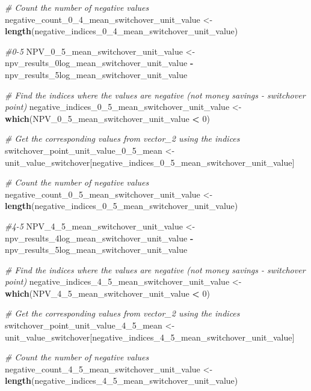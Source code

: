 \documentclass[
]{article}
\newenvironment{Shaded}{\begin{snugshade}}{\end{snugshade}}
\newcommand{\CommentTok}[1]{\textcolor[rgb]{0.56,0.35,0.01}{\textit{#1}}}
\newcommand{\DecValTok}[1]{\textcolor[rgb]{0.00,0.00,0.81}{#1}}
\newcommand{\FunctionTok}[1]{\textcolor[rgb]{0.13,0.29,0.53}{\textbf{#1}}}
\newcommand{\NormalTok}[1]{#1}
\newcommand{\OtherTok}[1]{\textcolor[rgb]{0.56,0.35,0.01}{#1}}
\newcommand{\SpecialCharTok}[1]{\textcolor[rgb]{0.81,0.36,0.00}{\textbf{#1}}}
\begin{document}
\begin{Shaded}
\begin{Highlighting}[]
\CommentTok{\# Count the number of negative values}
\NormalTok{negative\_count\_0\_4\_mean\_switchover\_unit\_value }\OtherTok{\textless{}{-}} \FunctionTok{length}\NormalTok{(negative\_indices\_0\_4\_mean\_switchover\_unit\_value)}


\CommentTok{\#0{-}5}
\NormalTok{NPV\_0\_5\_mean\_switchover\_unit\_value }\OtherTok{\textless{}{-}}\NormalTok{ npv\_results\_0log\_mean\_switchover\_unit\_value }\SpecialCharTok{{-}}\NormalTok{ npv\_results\_5log\_mean\_switchover\_unit\_value}

\CommentTok{\# Find the indices where the values are negative (not money savings {-} switchover point)}
\NormalTok{negative\_indices\_0\_5\_mean\_switchover\_unit\_value }\OtherTok{\textless{}{-}} \FunctionTok{which}\NormalTok{(NPV\_0\_5\_mean\_switchover\_unit\_value }\SpecialCharTok{\textless{}} \DecValTok{0}\NormalTok{)}

\CommentTok{\# Get the corresponding values from vector\_2 using the indices}
\NormalTok{switchover\_point\_unit\_value\_0\_5\_mean }\OtherTok{\textless{}{-}}\NormalTok{ unit\_value\_switchover[negative\_indices\_0\_5\_mean\_switchover\_unit\_value]}

\CommentTok{\# Count the number of negative values}
\NormalTok{negative\_count\_0\_5\_mean\_switchover\_unit\_value }\OtherTok{\textless{}{-}} \FunctionTok{length}\NormalTok{(negative\_indices\_0\_5\_mean\_switchover\_unit\_value)}


\CommentTok{\#4{-}5}
\NormalTok{NPV\_4\_5\_mean\_switchover\_unit\_value }\OtherTok{\textless{}{-}}\NormalTok{ npv\_results\_4log\_mean\_switchover\_unit\_value }\SpecialCharTok{{-}}\NormalTok{ npv\_results\_5log\_mean\_switchover\_unit\_value}

\CommentTok{\# Find the indices where the values are negative (not money savings {-} switchover point)}
\NormalTok{negative\_indices\_4\_5\_mean\_switchover\_unit\_value }\OtherTok{\textless{}{-}} \FunctionTok{which}\NormalTok{(NPV\_4\_5\_mean\_switchover\_unit\_value }\SpecialCharTok{\textless{}} \DecValTok{0}\NormalTok{)}

\CommentTok{\# Get the corresponding values from vector\_2 using the indices}
\NormalTok{switchover\_point\_unit\_value\_4\_5\_mean }\OtherTok{\textless{}{-}}\NormalTok{ unit\_value\_switchover[negative\_indices\_4\_5\_mean\_switchover\_unit\_value]}

\CommentTok{\# Count the number of negative values}
\NormalTok{negative\_count\_4\_5\_mean\_switchover\_unit\_value }\OtherTok{\textless{}{-}} \FunctionTok{length}\NormalTok{(negative\_indices\_4\_5\_mean\_switchover\_unit\_value)}
\end{Highlighting}
\end{Shaded}
\end{document}
